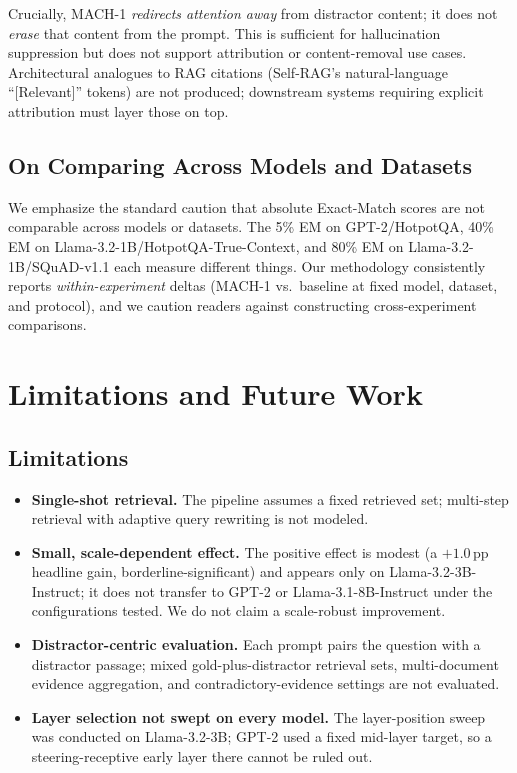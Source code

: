 \documentclass[conference]{IEEEtran}
\begin{document}
Crucially, MACH-1 \emph{redirects attention away} from distractor content; it does not \emph{erase} that content from the prompt. This is sufficient for hallucination suppression but does not support attribution or content-removal use cases. Architectural analogues to RAG citations (Self-RAG's natural-language ``[Relevant]'' tokens) are not produced; downstream systems requiring explicit attribution must layer those on top.

\subsection{On Comparing Across Models and Datasets}

We emphasize the standard caution that absolute Exact-Match scores are not comparable across models or datasets. The 5\% EM on GPT-2/HotpotQA, 40\% EM on Llama-3.2-1B/HotpotQA-True-Context, and 80\% EM on Llama-3.2-1B/SQuAD-v1.1 each measure different things. Our methodology consistently reports \emph{within-experiment} deltas (MACH-1 vs.\ baseline at fixed model, dataset, and protocol), and we caution readers against constructing cross-experiment comparisons.

\section{Limitations and Future Work}\label{sec:limitations}

\subsection{Limitations}

\begin{itemize}
    \item \textbf{Single-shot retrieval.} The pipeline assumes a fixed retrieved set; multi-step retrieval with adaptive query rewriting is not modeled.
    \item \textbf{Small, scale-dependent effect.} The positive effect is modest (a $+1.0$\,pp headline gain, borderline-significant) and appears only on Llama-3.2-3B-Instruct; it does not transfer to GPT-2 or Llama-3.1-8B-Instruct under the configurations tested. We do not claim a scale-robust improvement.
    \item \textbf{Distractor-centric evaluation.} Each prompt pairs the question with a distractor passage; mixed gold-plus-distractor retrieval sets, multi-document evidence aggregation, and contradictory-evidence settings are not evaluated.
    \item \textbf{Layer selection not swept on every model.} The layer-position sweep was conducted on Llama-3.2-3B; GPT-2 used a fixed mid-layer target, so a steering-receptive early layer there cannot be ruled out.
\end{itemize}
\end{document}
